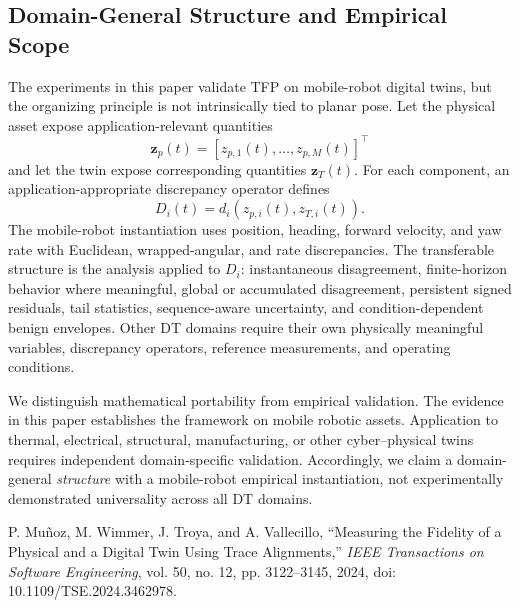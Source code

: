 \subsection{Domain-General Structure and Empirical Scope}
The experiments in this paper validate TFP on mobile-robot digital twins, but
the organizing principle is not intrinsically tied to planar pose. Let the
physical asset expose application-relevant quantities
\begin{equation}
\mathbf{z}_p(t)=[z_{p,1}(t),\ldots,z_{p,M}(t)]^\top
\end{equation}
and let the twin expose corresponding quantities $\mathbf{z}_T(t)$. For each
component, an application-appropriate discrepancy operator defines
\begin{equation}
D_i(t)=d_i\!\left(z_{p,i}(t),z_{T,i}(t)\right).
\end{equation}
The mobile-robot instantiation uses position, heading, forward velocity, and
yaw rate with Euclidean, wrapped-angular, and rate discrepancies. The
transferable structure is the analysis applied to $D_i$: instantaneous
disagreement, finite-horizon behavior where meaningful, global or accumulated
disagreement, persistent signed residuals, tail statistics, sequence-aware
uncertainty, and condition-dependent benign envelopes. Other DT domains
require their own physically meaningful variables, discrepancy operators,
reference measurements, and operating conditions.

We distinguish mathematical portability from empirical validation. The
evidence in this paper establishes the framework on mobile robotic assets.
Application to thermal, electrical, structural, manufacturing, or other
cyber--physical twins requires independent domain-specific validation.
Accordingly, we claim a domain-general \emph{structure} with a mobile-robot
empirical instantiation, not experimentally demonstrated universality across
all DT domains.

P. Mu\~noz, M. Wimmer, J. Troya, and A. Vallecillo,
``Measuring the Fidelity of a Physical and a Digital Twin Using Trace
Alignments,'' \emph{IEEE Transactions on Software Engineering}, vol. 50,
no. 12, pp. 3122--3145, 2024, doi: 10.1109/TSE.2024.3462978.
